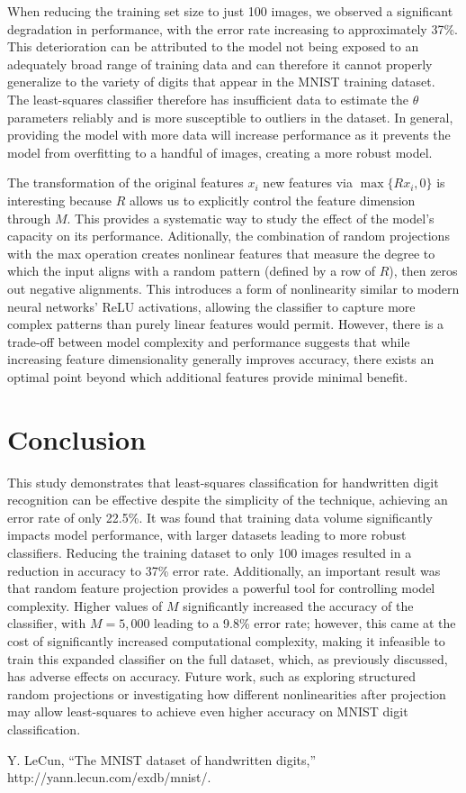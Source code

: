 \documentclass[conference]{IEEEtran}
\begin{document}
When reducing the training set size to just 100 images, we observed a significant degradation in performance, with the error rate increasing to approximately 37\%. This deterioration can be attributed to the model not being exposed to an adequately broad range of training data and can therefore it cannot properly generalize to the variety of digits that appear in the MNIST training dataset. The least-squares classifier therefore has insufficient data to estimate the $\theta$ parameters reliably and is more susceptible to outliers in the dataset. In general, providing the model with more data will increase performance as it prevents the model from overfitting to a handful of images, creating a more robust model.

The transformation of the original features $x_i$ new features via $\max \{Rx_i, 0\}$ is interesting because $R$ allows us to explicitly control the feature dimension through $M$. This provides a systematic way to study the effect of the model's capacity on its performance. Aditionally, the combination of random projections with the max operation creates nonlinear features that measure the degree to which the input aligns with a random pattern (defined by a row of $R$), then zeros out negative alignments. This introduces a form of nonlinearity similar to modern neural networks' ReLU activations, allowing the classifier to capture more complex patterns than purely linear features would permit. However, there is a trade-off between model complexity and performance suggests that while increasing feature dimensionality generally improves accuracy, there exists an optimal point beyond which additional features provide minimal benefit.

\section{Conclusion}

This study demonstrates that least-squares classification for handwritten digit recognition can be effective despite the simplicity of the technique, achieving an error rate of only 22.5\%. It was found that training data volume significantly impacts model performance, with larger datasets leading to more robust classifiers. Reducing the training dataset to only 100 images resulted in a reduction in accuracy to 37\% error rate. Additionally, an important result was that random feature projection provides a powerful tool for controlling model complexity. Higher values of $M$ significantly increased the accuracy of the classifier, with $M = 5,000$ leading to a 9.8\% error rate; however, this came at the cost of significantly increased computational complexity, making it infeasible to train this expanded classifier on the full dataset, which, as previously discussed, has adverse effects on accuracy. Future work, such as exploring structured random projections or investigating how different nonlinearities after projection may allow least-squares to achieve even higher accuracy on MNIST digit classification.

\begin{thebibliography}{00}

Y. LeCun, “The MNIST dataset of handwritten digits,”
http://yann.lecun.com/exdb/mnist/.


\end{thebibliography}
\end{document}

